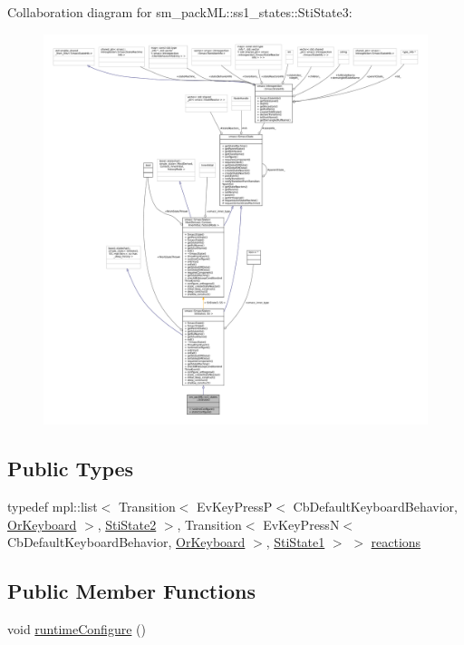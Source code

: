 Collaboration diagram for sm\+\_\+pack\+ML\+:\+:ss1\+\_\+states\+:\+:Sti\+State3\+:
\nopagebreak
\begin{figure}[H]
\begin{center}
\leavevmode
\includegraphics[width=350pt]{structsm__packML_1_1ss1__states_1_1StiState3__coll__graph}
\end{center}
\end{figure}
\subsection*{Public Types}
\begin{DoxyCompactItemize}
\item 
typedef mpl\+::list$<$ Transition$<$ Ev\+Key\+PressP$<$ Cb\+Default\+Keyboard\+Behavior, \hyperlink{classsm__packML_1_1OrKeyboard}{Or\+Keyboard} $>$, \hyperlink{structsm__packML_1_1ss1__states_1_1StiState2}{Sti\+State2} $>$, Transition$<$ Ev\+Key\+PressN$<$ Cb\+Default\+Keyboard\+Behavior, \hyperlink{classsm__packML_1_1OrKeyboard}{Or\+Keyboard} $>$, \hyperlink{structsm__packML_1_1ss1__states_1_1StiState1}{Sti\+State1} $>$ $>$ \hyperlink{structsm__packML_1_1ss1__states_1_1StiState3_ac2f467f9a95a2ef7f913ac8ec703651f}{reactions}
\end{DoxyCompactItemize}
\subsection*{Public Member Functions}
\begin{DoxyCompactItemize}
\item 
void \hyperlink{structsm__packML_1_1ss1__states_1_1StiState3_a8bd50bad550cda1962d6a15c5785863e}{runtime\+Configure} ()
\end{DoxyCompactItemize}
